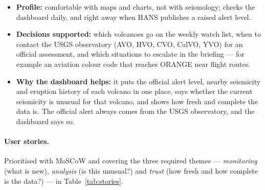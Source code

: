 \documentclass[11pt,a4paper]{article}
\begin{document}
\begin{itemize}
  \item \textbf{Profile:} comfortable with maps and charts, not with seismology;
  checks the dashboard daily, and right away when HANS publishes a raised alert level.
  \item \textbf{Decisions supported:} which volcanoes go on the weekly watch list,
  when to contact the USGS observatory (AVO, HVO, CVO, CalVO, YVO) for an official
  assessment, and which situations to escalate in the briefing --- for example an
  aviation colour code that reaches ORANGE near flight routes.
  \item \textbf{Why the dashboard helps:} it puts the official alert level, nearby
  seismicity and eruption history of each volcano in one place, says whether the
  current seismicity is unusual for that volcano, and shows how fresh and complete the
  data is. The official alert always comes from the USGS observatory, and the dashboard
  says so.
\end{itemize}

\paragraph{User stories.}
Prioritised with MoSCoW and covering the three required themes --- \emph{monitoring}
(what is new), \emph{analysis} (is this unusual?) and \emph{trust} (how fresh and how
complete is the data?) --- in Table~\ref{tab:stories}.
\end{document}
